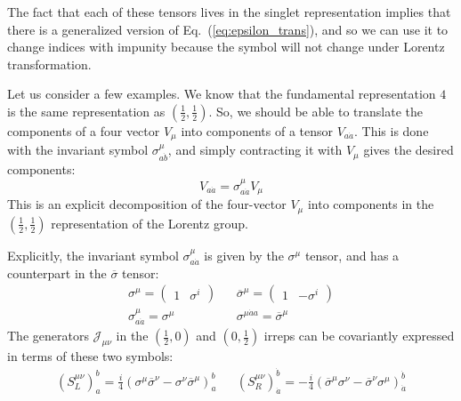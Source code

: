 \documentclass[11pt, oneside]{article}   	%
\theoremstyle{definition}
\begin{document}
The fact that each of these tensors lives in the singlet representation implies that there is a generalized version of Eq.~(\ref{eq:epsilon_trans}), 
and so we can use it to change indices with impunity because the symbol will not change under Lorentz transformation. 

Let us consider a few examples. We know that the fundamental representation $4$ is the same representation as $(\frac{1}{2}, \frac{1}{2})$. 
So, we should be able to translate the components of a four vector $V_\mu$ into components of a tensor $V_{a\dot a}$. This is done with the 
invariant symbol $\sigma_{a \dot b}^\mu$, and simply contracting it with $V_\mu$ gives the desired components:
\begin{equation}
	V_{a\dot a} = \sigma_{a\dot a}^\mu V_\mu
\end{equation}
This is an explicit decomposition of the four-vector $V_\mu$ into components in the $(\frac{1}{2}, \frac{1}{2})$ representation of the Lorentz 
group.

Explicitly, the invariant symbol $\sigma_{a\dot a}^\mu$ is given by the $\sigma^\mu$ tensor, and has a counterpart in the $\overline\sigma$ 
tensor:
\begin{align}
	\sigma^\mu = \begin{pmatrix} 1 & \sigma^i \end{pmatrix} && \overline\sigma^\mu = \begin{pmatrix} 1 & -\sigma^i \end{pmatrix} \\
	\sigma_{a\dot a}^\mu = \sigma^\mu && \sigma^{\mu\dot a a} = \overline\sigma^\mu
\end{align}
The generators $\mathcal J_{\mu\nu}$ in the $(\frac{1}{2}, 0)$ and $(0, \frac{1}{2})$ irreps can be covariantly expressed in terms of these two 
symbols:
\begin{align}
	(S_L^{\mu\nu})_a^b = \frac{i}{4}(\sigma^\mu\overline\sigma^\nu - \sigma^\nu\overline\sigma^\mu)_a^b &&
	(S_R^{\mu\nu})_{\dot a}^{\dot b} = -\frac{i}{4}(\overline\sigma^\mu\sigma^\nu - \overline\sigma^\nu\sigma^\mu)_{\dot a}^{\dot b}
\end{align}
\end{document}
